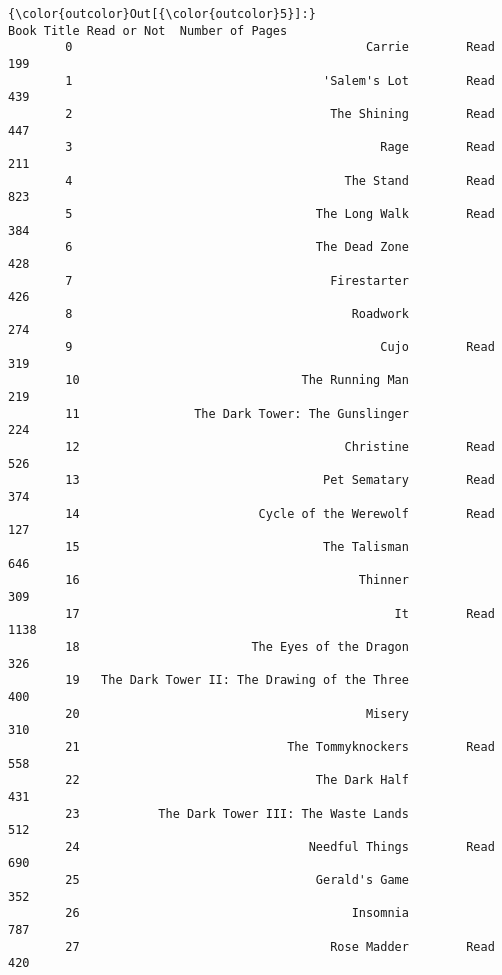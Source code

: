 \documentclass[11pt]{article}
\begin{document}
\begin{Verbatim}[commandchars=\\\{\}]
{\color{outcolor}Out[{\color{outcolor}5}]:}                                       Book Title Read or Not  Number of Pages
        0                                         Carrie        Read              199
        1                                   'Salem's Lot        Read              439
        2                                    The Shining        Read              447
        3                                           Rage        Read              211
        4                                      The Stand        Read              823
        5                                  The Long Walk        Read              384
        6                                  The Dead Zone                          428
        7                                    Firestarter                          426
        8                                       Roadwork                          274
        9                                           Cujo        Read              319
        10                               The Running Man                          219
        11                The Dark Tower: The Gunslinger                          224
        12                                     Christine        Read              526
        13                                  Pet Sematary        Read              374
        14                         Cycle of the Werewolf        Read              127
        15                                  The Talisman                          646
        16                                       Thinner                          309
        17                                            It        Read             1138
        18                        The Eyes of the Dragon                          326
        19   The Dark Tower II: The Drawing of the Three                          400
        20                                        Misery                          310
        21                             The Tommyknockers        Read              558
        22                                 The Dark Half                          431
        23           The Dark Tower III: The Waste Lands                          512
        24                                Needful Things        Read              690
        25                                 Gerald's Game                          352
        26                                      Insomnia                          787
        27                                   Rose Madder        Read              420

\end{Verbatim}
\end{document}
